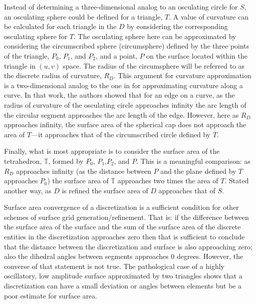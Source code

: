 Instead of determining a three-dimensional analog to an osculating
circle for $S$, an osculating sphere could be defined for a triangle,
$T$. A value of curvature can be calculated for each triangle in the $D$
by considering the corresponding osculating sphere for $T$. The
osculating sphere here can be approximated by considering the
circumscribed sphere (circumsphere) \cite{casey1888} defined by the
three points of the triangle, $P_0$, $P_1$, and $P_2$, and a point, $P$
on the surface located within the triangle in $(u,v)$ space. The radius
of the circumsphere will be referred to as the discrete radius of
curvature, $R_D$. This argument for curvature approximation is a
two-dimensional analog to the one in \cite{mclaurin12} for approximating
curvature along a curve. In that work, the authors showed that for an
edge on a curve, as the radius of curvature of the osculating circle
approaches infinity the arc length of the circular segment approaches
the arc length of the edge.  However, here as $R_D$ approaches infinity,
the surface area of the spherical cap does not approach the area of
$T$---it approaches that of the circumscribed circle defined by $T$.

Finally, what is most appropriate is to consider the surface area of the
tetrahedron, ${\mathbb T}$, formed by $P_0$, $P_1$,$P_2$, and $P$. This
is a meaningful comparison: as $R_D$ approaches infinity (as the
distance between $P$ and the plane defined by $T$ approaches $P_0$) the
surface area of ${\mathbb T}$ approaches two times the area of $T$.
Stated another way, as $D$ is refined the surface area of $D$ approaches
that of $S$.

Surface area convergence of a discretization is a sufficient condition
for other schemes of surface grid generation/refinement. That is: if the
difference between the surface area of the surface and the sum of the
surface area of the discrete entities in the discretization approaches
zero then that is sufficient to conclude that the distance between the
discretization and surface is also approaching zero; also the dihedral
angles between segments approaches $0$ degrees. However, the converse of
that statement is not true. The pathological case of a highly
oscillatory, low amplitude surface approximated by two triangles shows
that a discretization can have a small deviation or angles between
elements but be a poor estimate for surface area.
